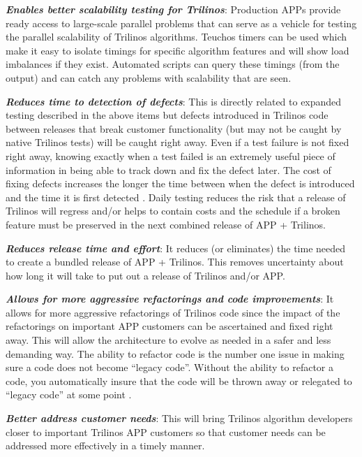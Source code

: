 \documentclass[pdf,ps2pdf,11pt]{SANDreport}
\begin{document}
{}\textit{\textbf{Enables better scalability testing for Trilinos}}:
Production APPs provide ready access to large-scale parallel problems that can
serve as a vehicle for testing the parallel scalability of Trilinos
algorithms.  Teuchos timers can be used which make it easy to isolate timings
for specific algorithm features and will show load imbalances if they exist.
Automated scripts can query these timings (from the output) and can catch any
problems with scalability that are seen.

{}\textit{\textbf{Reduces time to detection of defects}}: This is directly related
to expanded testing described in the above items but defects introduced in
Trilinos code between releases that break customer functionality (but may not
be caught by native Trilinos tests) will be caught right away.  Even if a test
failure is not fixed right away, knowing exactly when a test failed is an
extremely useful piece of information in being able to track down and fix the
defect later.  The cost of fixing defects increases the longer the time
between when the defect is introduced and the time it is first detected
{}\cite{book:code-complete-2}.  Daily testing reduces the risk that a release
of Trilinos will regress and/or helps to contain costs and the schedule if a
broken feature must be preserved in the next combined release of APP +
Trilinos.

{}\textit{\textbf{Reduces release time and effort}}: It reduces (or eliminates)
the time needed to create a bundled release of APP + Trilinos.  This removes
uncertainty about how long it will take to put out a release of Trilinos
and/or APP. 

{}\textit{\textbf{Allows for more aggressive refactorings and code
improvements}}: It allows for more aggressive refactorings of Trilinos code
since the impact of the refactorings on important APP customers can be
ascertained and fixed right away.  This will allow the architecture to evolve
as needed in a safer and less demanding way.  The ability to refactor code is
the number one issue in making sure a code does not become ``legacy code''.
Without the ability to refactor a code, you automatically insure that the code
will be thrown away or relegated to ``legacy code'' at some point
{}\cite{book:code-complete-2}.

{}\textit{\textbf{Better address customer needs}}: This will bring Trilinos
algorithm developers closer to important Trilinos APP customers so that
customer needs can be addressed more effectively in a timely manner.
\end{document}
